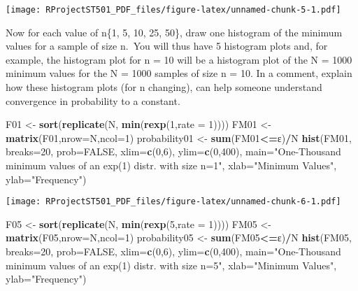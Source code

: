 \documentclass[
]{article}
\newenvironment{Shaded}{\begin{snugshade}}{\end{snugshade}}
\newcommand{\DataTypeTok}[1]{\textcolor[rgb]{0.13,0.29,0.53}{#1}}
\newcommand{\DecValTok}[1]{\textcolor[rgb]{0.00,0.00,0.81}{#1}}
\newcommand{\KeywordTok}[1]{\textcolor[rgb]{0.13,0.29,0.53}{\textbf{#1}}}
\newcommand{\NormalTok}[1]{#1}
\newcommand{\OperatorTok}[1]{\textcolor[rgb]{0.81,0.36,0.00}{\textbf{#1}}}
\newcommand{\OtherTok}[1]{\textcolor[rgb]{0.56,0.35,0.01}{#1}}
\newcommand{\StringTok}[1]{\textcolor[rgb]{0.31,0.60,0.02}{#1}}
\begin{document}
\texttt{[image: RProjectST501\_PDF\_files/figure-latex/unnamed-chunk-5-1.pdf]}

Now for each value of n\{1, 5, 10, 25, 50\}, draw one histogram of the
minimum values for a sample of size n.~You will thus have 5 histogram
plots and, for example, the histogram plot for n = 10 will be a
histogram plot of the N = 1000 minimum values for the N = 1000 samples
of size n = 10. In a comment, explain how these histogram plots (for n
changing), can help someone understand convergence in probability to a
constant.

\begin{Shaded}
\begin{Highlighting}[]
\NormalTok{F01 <-}\StringTok{ }\KeywordTok{sort}\NormalTok{(}\KeywordTok{replicate}\NormalTok{(N, }\KeywordTok{min}\NormalTok{(}\KeywordTok{rexp}\NormalTok{(}\DecValTok{1}\NormalTok{,}\DataTypeTok{rate =} \DecValTok{1}\NormalTok{))))}
\NormalTok{FM01 <-}\StringTok{ }\KeywordTok{matrix}\NormalTok{(F01,}\DataTypeTok{nrow=}\NormalTok{N,}\DataTypeTok{ncol=}\DecValTok{1}\NormalTok{)}
\NormalTok{probability01 <-}\StringTok{ }\KeywordTok{sum}\NormalTok{(FM01}\OperatorTok{<=}\NormalTok{ε)}\OperatorTok{/}\NormalTok{N}
\KeywordTok{hist}\NormalTok{(FM01, }\DataTypeTok{breaks=}\DecValTok{20}\NormalTok{, }\DataTypeTok{prob=}\OtherTok{FALSE}\NormalTok{, }\DataTypeTok{xlim=}\KeywordTok{c}\NormalTok{(}\DecValTok{0}\NormalTok{,}\DecValTok{6}\NormalTok{), }\DataTypeTok{ylim=}\KeywordTok{c}\NormalTok{(}\DecValTok{0}\NormalTok{,}\DecValTok{400}\NormalTok{), }\DataTypeTok{main=}\StringTok{"One-Thousand minimum values of an exp(1) distr. with size n=1"}\NormalTok{, }\DataTypeTok{xlab=}\StringTok{"Minimum Values"}\NormalTok{, }\DataTypeTok{ylab=}\StringTok{"Frequency"}\NormalTok{)}
\end{Highlighting}
\end{Shaded}

\texttt{[image: RProjectST501\_PDF\_files/figure-latex/unnamed-chunk-6-1.pdf]}

\begin{Shaded}
\begin{Highlighting}[]
\NormalTok{F05 <-}\StringTok{ }\KeywordTok{sort}\NormalTok{(}\KeywordTok{replicate}\NormalTok{(N, }\KeywordTok{min}\NormalTok{(}\KeywordTok{rexp}\NormalTok{(}\DecValTok{5}\NormalTok{,}\DataTypeTok{rate =} \DecValTok{1}\NormalTok{))))}
\NormalTok{FM05 <-}\StringTok{ }\KeywordTok{matrix}\NormalTok{(F05,}\DataTypeTok{nrow=}\NormalTok{N,}\DataTypeTok{ncol=}\DecValTok{1}\NormalTok{)}
\NormalTok{probability05 <-}\StringTok{ }\KeywordTok{sum}\NormalTok{(FM05}\OperatorTok{<=}\NormalTok{ε)}\OperatorTok{/}\NormalTok{N}
\KeywordTok{hist}\NormalTok{(FM05, }\DataTypeTok{breaks=}\DecValTok{20}\NormalTok{, }\DataTypeTok{prob=}\OtherTok{FALSE}\NormalTok{, }\DataTypeTok{xlim=}\KeywordTok{c}\NormalTok{(}\DecValTok{0}\NormalTok{,}\DecValTok{6}\NormalTok{), }\DataTypeTok{ylim=}\KeywordTok{c}\NormalTok{(}\DecValTok{0}\NormalTok{,}\DecValTok{400}\NormalTok{), }\DataTypeTok{main=}\StringTok{"One-Thousand minimum values of an exp(1) distr. with size n=5"}\NormalTok{, }\DataTypeTok{xlab=}\StringTok{"Minimum Values"}\NormalTok{, }\DataTypeTok{ylab=}\StringTok{"Frequency"}\NormalTok{)}
\end{Highlighting}
\end{Shaded}
\end{document}
